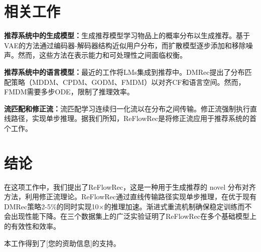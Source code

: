 \documentclass[sigconf]{acmart}
\begin{document}
\section{相关工作}
\textbf{推荐系统中的生成模型：}生成推荐模型\cite{liang2018variational, wang2023diffusion, zhang2023revisiting}学习物品上的概率分布以生成推荐。基于VAE的方法\cite{liang2018variational}通过编码器-解码器结构近似用户分布，而扩散模型\cite{wang2023diffusion}逐步添加和移除噪声。然而，这些方法在表示能力和可处理性之间面临权衡\cite{kingma2016improved}。

\textbf{推荐系统中的语言模型：}最近的工作将LMs集成到推荐中\cite{xi2024towards, ren2024representation, wei2024llmrec}。DMRec\cite{zhang2024dmrec}提出了分布匹配策略（MDDM、CPDM、GODM、FMDM）以对齐CF和语言空间。然而，FMDM需要多步ODE，限制了推理效率。

\textbf{流匹配和修正流：}流匹配\cite{liu2022flow}学习连续归一化流以在分布之间传输。修正流\cite{lipman2023rectified}强制执行直线路径，实现单步推理。据我们所知，\textsf{ReFlowRec}是将修正流应用于推荐系统的首个工作。

\section{结论}
在这项工作中，我们提出了\textsf{ReFlowRec}，这是一种用于生成推荐的 novel 分布对齐方法，利用修正流理论。\textsf{ReFlowRec}通过直线传输路径实现单步推理，在优于现有DMRec策略2-5\%的同时实现10$\times$的推理加速。渐进式重流机制确保稳定训练而不会出现性能下降。在三个数据集上的广泛实验证明了\textsf{ReFlowRec}在多个基础模型上的有效性和效率。

\begin{acks}
本工作得到了[您的资助信息]的支持。
\end{acks}



\end{document}
